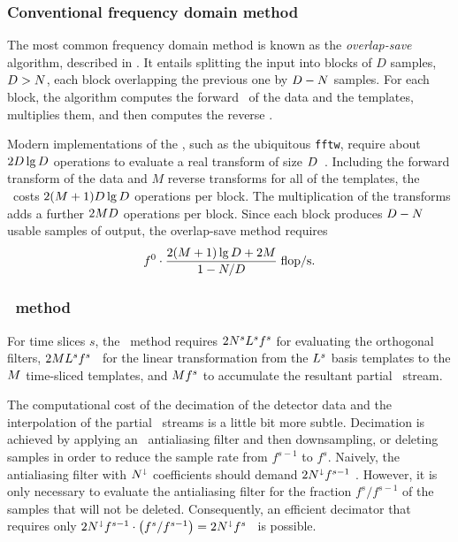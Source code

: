 \subsubsection{Conventional frequency domain method}

The most common frequency domain method is known as the \emph{overlap-save} algorithm, described in \cite{numerical-recipes-chapter-13}.  It entails splitting the input into blocks of $D$ samples, $D > N$, each block overlapping the previous one by $D - N$ samples.  For each block, the algorithm computes the forward \fft\ of the data and the templates, multiplies them, and then computes the reverse \fft.

Modern implementations of the \fft, such as the ubiquitous \texttt{fftw}, require about $2 D \lg D$ operations to evaluate a real transform of size $D$~\cite{Johnson:2007p9654}.  Including the forward transform of the data and $M$ reverse transforms for all of the templates, the \fft\ costs $2 (M + 1) D \lg D$ operations per block.  The multiplication of the transforms adds a further $2 M D$ operations per block.  Since each block produces $D - N$ usable samples of output, the overlap-save method requires
$$
f^0 \cdot \frac{2 (M + 1) \lg D + 2 M}{1 - N/D} \; \mathrm{flop/s}.
$$

\subsubsection{\lloid\ method}

For time slices $s$, the \lloid\ method requires $2 N^s L^s f^s$ for evaluating the orthogonal filters, $2 M L^s f^s$ \flops\ for the linear transformation from the $L^s$ basis templates to the $M$ time-sliced templates, and $M f^s$ \flops to accumulate the resultant partial \SNR\ stream.

The computational cost of the decimation of the detector data and the interpolation of the partial \SNR\ streams is a little bit more subtle.  Decimation is achieved by applying an \fir\ antialiasing filter and then downsampling, or deleting samples in order to reduce the sample rate from $f^{s-1}$ to $f^s$.  Naively, the antialiasing filter with $N^\shortdownarrow$ coefficients should demand $2 N^\shortdownarrow f^{s-1}$ \flops.  However, it is only necessary to evaluate the antialiasing filter for the fraction $f^s / f^{s-1}$ of the samples that will not be deleted.  Consequently, an efficient decimator that requires only $2 N^\shortdownarrow f^{s-1} \cdot \left( f^s / f^{s-1} \right) = 2 N^\shortdownarrow f^s$ \flops\ is possible.

